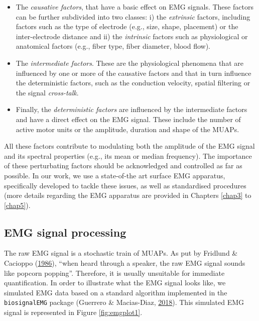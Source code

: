 \documentclass[a4paper,12pt,twoside,onecolumn,openright,final,oldfontcommands]{memoir}
\begin{document}
\begin{itemize}
\item
  The \emph{causative factors}, that have a basic effect on EMG signals. These factors can be further subdivided into two classes: i) the \emph{extrinsic} factors, including factors such as the type of electrode (e.g., size, shape, placement) or the inter-electrode distance and ii) the \emph{intrinsic} factors such as physiological or anatomical factors (e.g., fiber type, fiber diameter, blood flow).
\item
  The \emph{intermediate factors}. These are the physiological phenomena that are influenced by one or more of the causative factors and that in turn influence the deterministic factors, such as the conduction velocity, spatial filtering or the signal \emph{cross-talk}.
\item
  Finally, the \emph{deterministic factors} are influenced by the intermediate factors and have a direct effect on the EMG signal. These include the number of active motor units or the amplitude, duration and shape of the MUAPs.
\end{itemize}

All these factors contribute to modulating both the amplitude of the EMG signal and its spectral properties (e.g., its mean or median frequency). The importance of these perturbating factors should be acknowledged and controlled as far as possible. In our work, we use a state-of-the art surface EMG apparatus, specifically developed to tackle these issues, as well as standardised procedures (more details regarding the EMG apparatus are provided in Chapters \ref{chap3} to \ref{chap5}).

\hypertarget{emg-signal-processing}{%
\subsection{EMG signal processing}\label{emg-signal-processing}}

The raw EMG signal is a stochastic train of MUAPs. As put by Fridlund \& Cacioppo (\protect\hyperlink{ref-fridlund_guidelines_1986}{1986}), \enquote{when heard through a speaker, the raw EMG signal sounds like popcorn popping}. Therefore, it is usually unsuitable for immediate quantification. In order to illustrate what the EMG signal looks like, we simulated EMG data based on a standard algorithm implemented in the \texttt{biosignalEMG} package (Guerrero \& Macias-Diaz, \protect\hyperlink{ref-R-biosignalEMG}{2018}). This simulated EMG signal is represented in Figure \ref{fig:emgplot1}.
\end{document}
